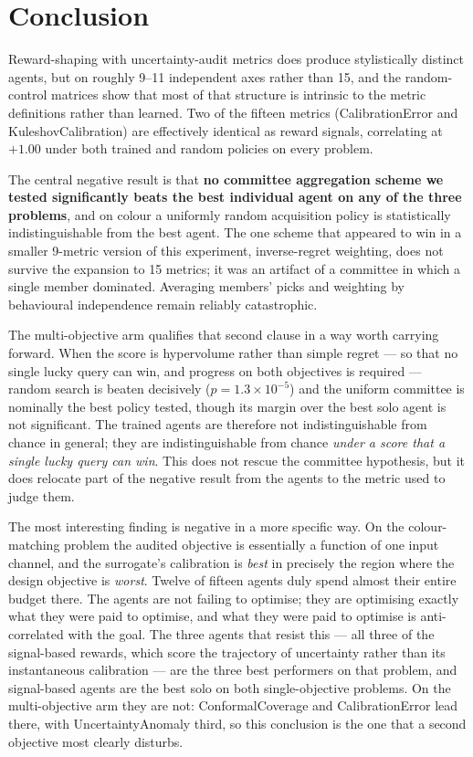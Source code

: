 \documentclass[11pt]{article}
\begin{document}
\section{Conclusion}

Reward-shaping with uncertainty-audit metrics does produce stylistically distinct agents, but on roughly 9--11 independent axes rather than 15, and the random-control matrices show that most of that structure is intrinsic to the metric definitions rather than learned. Two of the fifteen metrics (CalibrationError and KuleshovCalibration) are effectively identical as reward signals, correlating at $+1.00$ under both trained and random policies on every problem.

The central negative result is that \textbf{no committee aggregation scheme we tested significantly beats the best individual agent on any of the three problems}, and on colour a uniformly random acquisition policy is statistically indistinguishable from the best agent. The one scheme that appeared to win in a smaller 9-metric version of this experiment, inverse-regret weighting, does not survive the expansion to 15 metrics; it was an artifact of a committee in which a single member dominated. Averaging members' picks and weighting by behavioural independence remain reliably catastrophic.

The multi-objective arm qualifies that second clause in a way worth carrying forward. When the score is hypervolume rather than simple regret --- so that no single lucky query can win, and progress on both objectives is required --- random search is beaten decisively ($p = 1.3\times10^{-5}$) and the uniform committee is nominally the best policy tested, though its margin over the best solo agent is not significant. The trained agents are therefore not indistinguishable from chance in general; they are indistinguishable from chance \emph{under a score that a single lucky query can win}. This does not rescue the committee hypothesis, but it does relocate part of the negative result from the agents to the metric used to judge them.

The most interesting finding is negative in a more specific way. On the colour-matching problem the audited objective is essentially a function of one input channel, and the surrogate's calibration is \emph{best} in precisely the region where the design objective is \emph{worst}. Twelve of fifteen agents duly spend almost their entire budget there. The agents are not failing to optimise; they are optimising exactly what they were paid to optimise, and what they were paid to optimise is anti-correlated with the goal. The three agents that resist this --- all three of the signal-based rewards, which score the trajectory of uncertainty rather than its instantaneous calibration --- are the three best performers on that problem, and signal-based agents are the best solo on both single-objective problems. On the multi-objective arm they are not: ConformalCoverage and CalibrationError lead there, with UncertaintyAnomaly third, so this conclusion is the one that a second objective most clearly disturbs.
\end{document}
